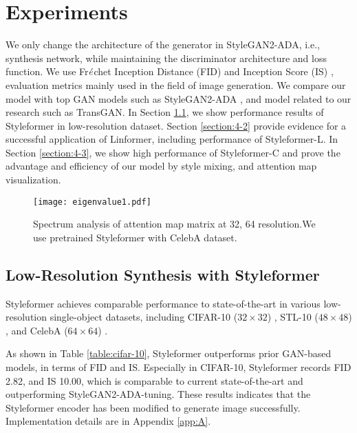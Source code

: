 \documentclass[10pt,twocolumn,letterpaper]{article}
\begin{document}
\section{Experiments}
\label{sec:4}
We only change the architecture of the generator in StyleGAN2-ADA, i.e., synthesis network, while maintaining the discriminator architecture and loss function. We use Fr$\Acute{e}$chet Inception Distance (FID) \cite{heusel2018gans} and Inception Score (IS) \cite{salimans2016improved}, evaluation metrics mainly used in the field of image generation. We compare our model with top GAN models such as StyleGAN2-ADA \cite{karras2020training}, and model related to our research such as TransGAN.
In Section \ref{section:4-1}, we show performance results of Styleformer in low-resolution dataset. Section \ref{section:4-2} provide evidence for a successful application of Linformer, including performance of Styleformer-L. In Section \ref{section:4-3}, we show high performance of Styleformer-C and prove the advantage and efficiency of our model by style mixing, and attention map visualization.












\begin{figure}[t]
\begin{center}
\texttt{[image: eigenvalue1.pdf]}
\end{center}
\vspace{-5mm}
\caption{Spectrum analysis of attention map matrix at 32, 64 resolution.We use pretrained Styleformer with CelebA dataset. 
}
\vspace{-3mm}
\label{fig:eigenvalue}
\end{figure}


\subsection{Low-Resolution Synthesis with Styleformer}
\label{section:4-1}
Styleformer achieves comparable performance to state-of-the-art in various low-resolution single-object datasets, including CIFAR-10 ($32 \times 32$) \cite{Krizhevsky09learningmultiple}, STL-10 ($48 \times 48$) \cite{pmlr-v15-coates11a}, and CelebA ($64 \times 64$) \cite{liu2015faceattributes}. 

As shown in Table \ref{table:cifar-10}, Styleformer outperforms prior GAN-based models, in terms of FID and IS. Especially in CIFAR-10, Styleformer records FID 2.82, and IS 10.00, which is comparable to current state-of-the-art and outperforming StyleGAN2-ADA-tuning. These results indicates that the Styleformer encoder has been modified to generate image successfully. Implementation details are in Appendix \ref{app:A}.
\end{document}
